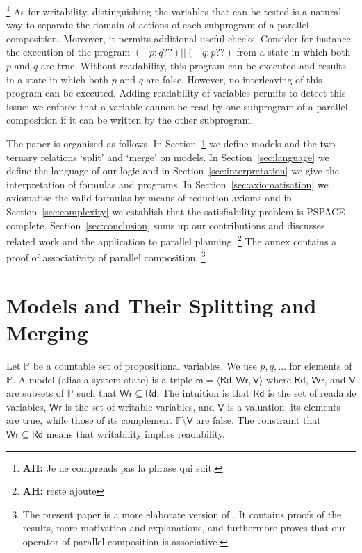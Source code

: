 \documentclass{llncs}
\newcommand{\atmset}{\mathtt{\mathbb X}}	%
\newcommand{\modl}{\mathsf m}
\newcommand{\pll}{ {||} }							%
\newcommand{\readable}[1]{\mathtt{r}_{#1}}
\newcommand{\readset}{\mathsf{Rd}}
\newcommand{\valuset}{\mathsf{V}}
\newcommand{\writable}[1]{\mathtt{w}_{#1}}
\newcommand{\writeset}{\mathsf{Wr}}
\newcommand{\testendo}{?\!\!?}			%
\newcommand{\ah}[1]{\footnote{\textbf{AH:} #1}}
\newcommand{\assgnbotV}[1]{{\mathtt {-} #1}}
\newcommand{\propset}{\mathbb P}
\newcommand{\tuple}[1]{ \langle #1 \rangle}
\begin{document}
\ah{
Je ne comprends pas la phrase qui suit.
}
As for writability, distinguishing the variables that can be tested is a natural way to separate the domain of actions of each subprogram of a parallel composition.
Moreover, it permits additional useful checks.
Consider for instance the execution of the program $\left(\assgnbotV p ; q \testendo \right) \pll \left(\assgnbotV q ; p \testendo\right)$
from a state in which both $p$ and $q$ are true.
Without readability, this program can be executed and results in a state in which both $p$ and $q$ are false.
However, no interleaving of this program can be executed.
Adding readability of variables permits to detect this issue:
we enforce that a variable cannot be read by one subprogram of a parallel composition if it can be written by the other subprogram.

The paper is organised as follows.
In Section~\ref{sec:models} we define models and the two ternary relations `split' and `merge' on models. 
In Section~\ref{sec:language} we define the language of our logic and 
in Section~\ref{sec:interpretation} we give the interpretation of formulas and programs. 
In Section~\ref{sec:axiomatisation} we axiomatise the valid formulas by means of reduction axioms and
in Section~\ref{sec:complexity} we establish that the satisfiability problem is PSPACE complete. 
Section~\ref{sec:conclusion} sums up our contributions and discusses related work and the application to parallel planning. 
\ah{
reste ajoute
}
The annex contains a proof of associativity of parallel composition. 
\footnote{
The present paper is a more elaborate version of %
\cite{DBLP:conf/tap/BoudouHT19}. 
It contains proofs of the results, more motivation and explanations, and furthermore proves that our operator of parallel composition is associative. 
}


\section{Models and Their Splitting and Merging }\label{sec:models} 

Let $\propset$ be a countable set of propositional variables. 
We use $p, q,\ldots$ for elements of $\propset$. 
A model (alias a system state) is a %
triple $\modl = \tuple{\readset,\writeset,\valuset}$ 
where $\readset$, $\writeset$, and $\valuset$ are subsets of $\propset$ such that $\writeset \subseteq \readset$. 
The intuition is that $\readset$ is the set of readable variables, $\writeset$ is the set of writable variables, and $\valuset$ is a valuation: 
its elements are true, while those of its complement $\propset \setminus \valuset$ are false. 
The constraint that $\writeset \subseteq \readset$ means that writability implies readability. 
\end{document}
